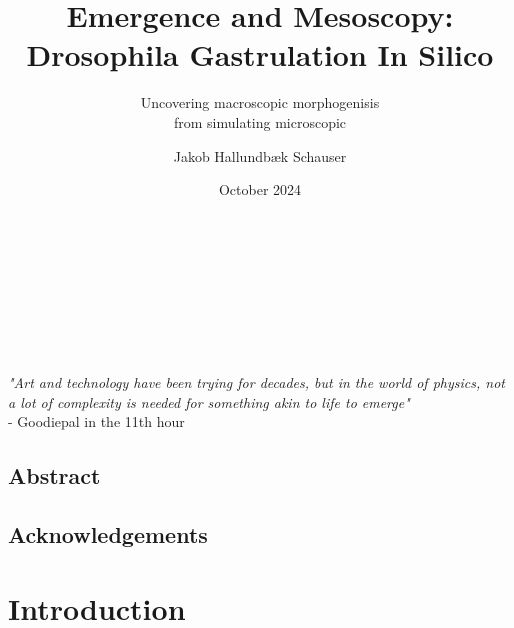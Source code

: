 \documentclass[12pt, oneside]{book}
\author{Jakob Hallundbæk Schauser}
\title{Emergence and Mesoscopy:\\ Drosophila Gastrulation In Silico}
\subtitle{Uncovering macroscopic morphogenisis\\ from simulating microscopic}
\date{October 2024}
\renewcommand{\headrulewidth}{0pt}
\newcommand\mymainpagestyle{%
\fancyhf{}      
\fancyhead[L]{\nouppercase{\footnotesize{\chaptername~ \thechapter~ |~ \leftmark}} \renewcommand{\headrulewidth}{0.4pt} \headrule \renewcommand{\headrulewidth}{0pt}}
\setlength{\headheight}{25pt}
\fancyfoot[C]{\thepage}
}
\begin{document}


\maketitle
\frontmatter %
\pagestyle{plain} %

\newpage \ \\\\\\\\\\\\\textit{"Art and technology have been trying for decades, but in the world of physics, not a lot of complexity is needed for something akin to life to emerge"} \\- Goodiepal in the 11th hour%

\section*{Abstract}
\label{sec:abstract}


\newpage
\section*{Acknowledgements}
\label{sec:acks}


\newpage
\tableofcontents
\newpage


\mainmatter 
\mymainpagestyle{} %

\chapter{Introduction}
\label{chap:intro}

\end{document}
